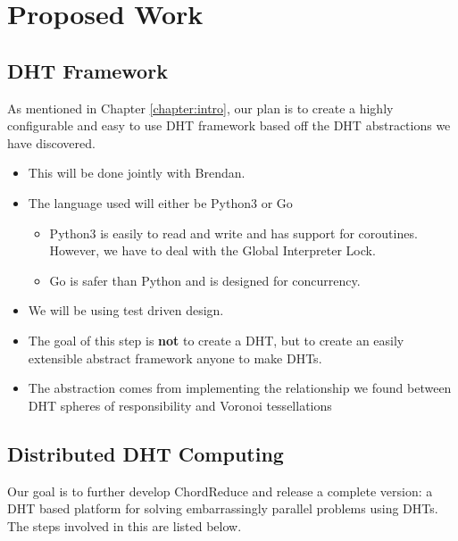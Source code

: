 \chapter{Proposed Work}
\label{chapter:experiments}


\section{DHT Framework}
As mentioned in Chapter \ref{chapter:intro}, our plan is to create a highly configurable and easy to use DHT framework based off the DHT abstractions we have discovered.

\begin{itemize}
	\item This will be done jointly with Brendan.
	\item The language used will either be Python3 or Go
	\begin{itemize}
		\item Python3 is easily to read and write and has support for coroutines.  However, we have to deal with the Global Interpreter Lock.
		\item Go is safer than Python and is designed for concurrency.
	\end{itemize}
	\item We will be using test driven design.
	\item The goal of this step is \textbf{not} to create a DHT, but to create an easily extensible abstract framework anyone to make DHTs.
	\item The abstraction comes from implementing the relationship we found between DHT spheres of responsibility and Voronoi tessellations
	
\end{itemize}


\section{Distributed DHT Computing}


Our goal is to further develop ChordReduce and release a complete version: a DHT based platform for solving embarrassingly parallel problems using DHTs.
The steps involved in this are listed below.

